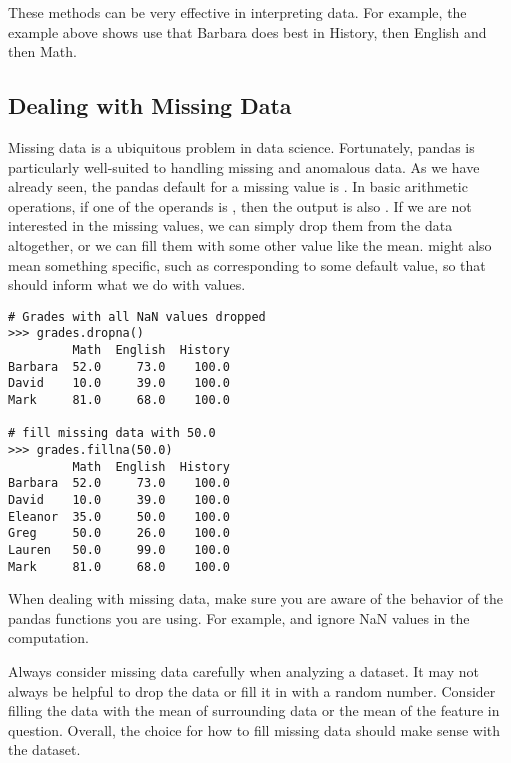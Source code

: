 These methods can be very effective in interpreting data.
For example, the  example above shows use that Barbara does best in History, then English and then Math.

\subsection*{Dealing with Missing Data}

Missing data is a ubiquitous problem in data science.
Fortunately, pandas is particularly well-suited to
handling missing and anomalous data.
As we have already seen, the pandas default for a missing value is .
In basic arithmetic operations, if one of the operands is , then the output is also .
If we are not interested in the missing values, we can simply drop them from the data altogether, or we can fill them with some other value like the mean.
 might also mean something specific, such as corresponding to some default value, so that should inform what we do with  values.

\begin{lstlisting}
# Grades with all NaN values dropped
>>> grades.dropna()
         Math  English  History
Barbara  52.0     73.0    100.0
David    10.0     39.0    100.0
Mark     81.0     68.0    100.0

# fill missing data with 50.0
>>> grades.fillna(50.0)
         Math  English  History
Barbara  52.0     73.0    100.0
David    10.0     39.0    100.0
Eleanor  35.0     50.0    100.0
Greg     50.0     26.0    100.0
Lauren   50.0     99.0    100.0
Mark     81.0     68.0    100.0
\end{lstlisting}

When dealing with missing data, make sure you are aware of the behavior of the pandas functions you are using.
For example,  and  ignore NaN values in the computation.

\begin{warn}
Always consider missing data carefully when analyzing a dataset.
It may not always be helpful to drop the data or fill it in with a random number.
Consider filling the data with the mean of surrounding data or the mean of the feature in question.
Overall, the choice for how to fill missing data should make sense with the dataset.
\end{warn}

